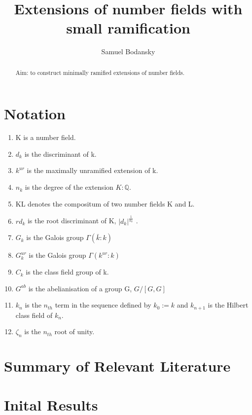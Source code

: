 \documentclass[preprint,12pt]{elsarticle}
\begin{document}
\begin{frontmatter}


\title{Extensions of number fields with small ramification}



\author{Samuel Bodansky}

\address{Oxford,UK}

\begin{abstract}
Aim: to construct minimally ramified extensions of number fields.
\end{abstract}
\end{frontmatter}
\section{Notation}
\begin{enumerate}
    \item K is a number field.
    \item $d_k$ is the discriminant of k.
    \item $k^{ur}$ is the maximally unramified extension of k.
    \item $n_k$ is the degree of the extension $K:\mathbb{Q}$.
    \item KL denotes the compositum of two number fields K and L.
    \item $rd_k$ is the root discriminant of K, $|d_k|^\frac{1}{n_k}$ .
    \item $G_k$ is the Galois group $\Gamma(\bar{k}:k)$
    \item $G_k^{ur}$ is the Galois group $\Gamma(k^{ur}:k)$
    \item $C_k$ is the class field group of k. 
    \item $G^{ab}$ is the abelianisation of a group G, $G/[G,G]$
    \item $k_n$ is the $n_{th}$ term in the sequence defined by $k_0:=k$ and $k_{n+1}$ is the Hilbert class field of $k_n$.
    \item $\zeta_n$ is the $n_{th}$ root of unity. 
\end{enumerate}

\section{Summary of Relevant Literature}

\section{Inital Results}
\end{document}
